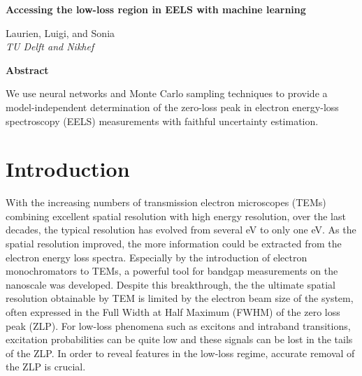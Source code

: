 \documentclass[11pt,a4paper]{article}
\numberwithin{equation}{section}
\numberwithin{figure}{section}
\numberwithin{table}{section}
\begin{document}

\vspace{2cm}

\begin{center}
  {\Large \bf
  Accessing the low-loss region in EELS with machine learning
  }
\vspace{1.4cm}


 Laurien, Luigi, and Sonia\\


\vspace{0.4cm}
       {\it TU Delft and Nikhef
       }

       \vspace{1.0cm}

       {\bf \large Abstract}
       
\end{center}

We use neural networks and Monte Carlo sampling techniques
to provide a model-independent determination of the zero-loss peak
in electron energy-loss spectroscopy (EELS) measurements with faithful uncertainty estimation.

\tableofcontents

\section{Introduction}
With the increasing numbers of transmission electron microscopes (TEMs) combining excellent spatial resolution with high energy resolution, over the last decades, the typical resolution has evolved from several eV to only one eV. As the spatial resolution improved, the more information could be extracted from the electron energy loss spectra. Especially by the introduction of electron monochromators to TEMs, a powerful tool for bandgap measurements on the nanoscale was developed.  
Despite this breakthrough, the the ultimate spatial resolution obtainable by TEM is limited by the electron beam size of the system, often expressed in the Full Width at Half Maximum (FWHM) of the zero loss peak (ZLP).  For low-loss phenomena such as excitons and intraband transitions, excitation probabilities can be quite low and these signals can be lost in the tails of the ZLP. In order to reveal features in the low-loss regime, accurate removal of the ZLP is crucial. 
\end{document}
